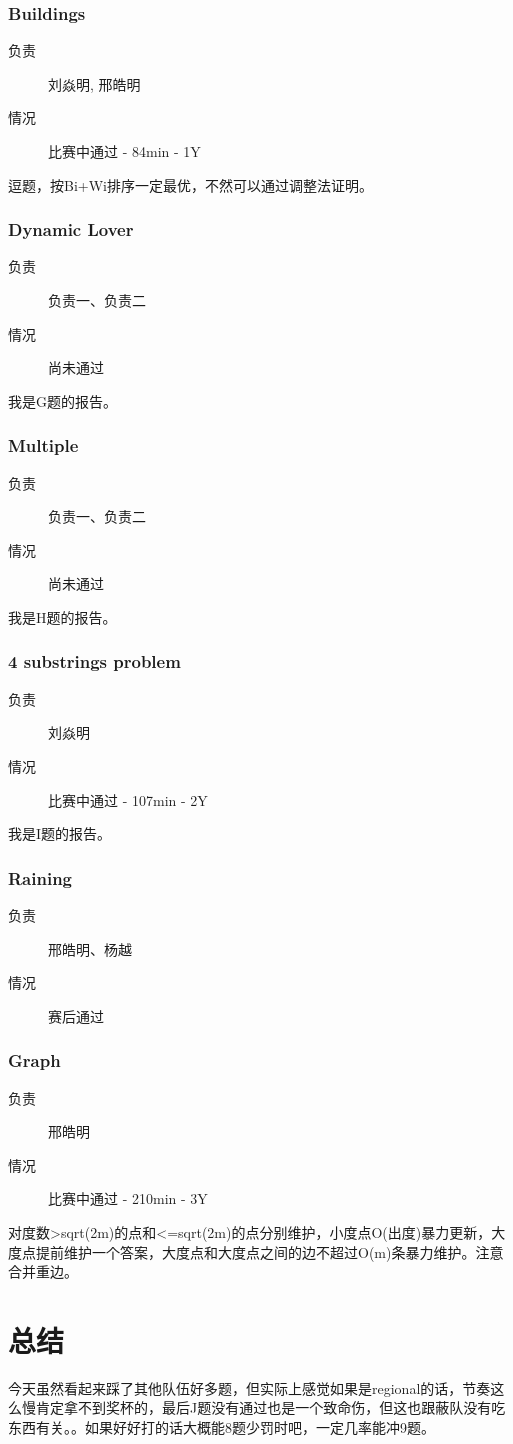 \documentclass[a4paper, 11pt, nofonts, nocap, fancyhdr]{ctexart}
\newcommand{\problem}[1]{\subsubsection{#1}}
\begin{document}
\problem{Buildings}

\begin{description}
\item[负责] 刘焱明, 邢皓明
\item[情况] 比赛中通过 - 84min - 1Y
\end{description}

逗题，按Bi+Wi排序一定最优，不然可以通过调整法证明。

\problem{Dynamic Lover}

\begin{description}
\item[负责] 负责一、负责二
\item[情况] 尚未通过
\end{description}

我是G题的报告。


\problem{Multiple}

\begin{description}
\item[负责] 负责一、负责二
\item[情况] 尚未通过
\end{description}

我是H题的报告。

\problem{4 substrings problem}

\begin{description}
\item[负责] 刘焱明
\item[情况] 比赛中通过 - 107min - 2Y
\end{description}

我是I题的报告。

\problem{Raining}

\begin{description}
\item[负责] 邢皓明、杨越
\item[情况] 赛后通过
\end{description}



\problem{Graph}

\begin{description}
\item[负责] 邢皓明
\item[情况] 比赛中通过 - 210min - 3Y
\end{description}

对度数>sqrt(2m)的点和<=sqrt(2m)的点分别维护，小度点O(出度)暴力更新，大度点提前维护一个答案，大度点和大度点之间的边不超过O(m)条暴力维护。注意合并重边。

\section{总结}

今天虽然看起来踩了其他队伍好多题，但实际上感觉如果是regional的话，节奏这么慢肯定拿不到奖杯的，最后J题没有通过也是一个致命伤，但这也跟蔽队没有吃东西有关。。如果好好打的话大概能8题少罚时吧，一定几率能冲9题。
\end{document}
